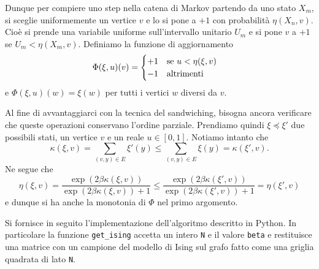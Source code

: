 \documentclass[]{marticle}
\begin{document}
Dunque per compiere uno step nella catena di Markov partendo da uno stato $X_m$,
si sceglie uniformemente un vertice $v$ e lo si pone a $+1$ con probabilit\`a
$\eta(X_n, v)$. Cio\`e si prende una variabile uniforme sull'intervallo unitario
$U_m$ e si pone $v$ a $+1$ se $U_m<\eta(X_m,v)$. Definiamo la funzione di
aggiornamento
\[
    \Phi(\xi, u)(v) = 
    \begin{cases}
        +1 \text{\quad se $u < \eta(\xi,v)$}\\
        -1 \text{\quad altrimenti}
    \end{cases}
\]
e $\Phi(\xi,u)(w) = \xi(w)$ per tutti i vertici $w$ diversi da $v$.

Al fine di avvantaggiarci con la tecnica del sandwiching, bisogna ancora
verificare che queste operazioni conservano l'ordine parziale. Prendiamo quindi
$\xi \preceq \xi'$ due possibili stati, un vertice $v$ e un reale $u\in[0,1]$.
Notiamo intanto che
\[
    \kappa(\xi,v) = \sum_{(v,y)\in E} \xi'(y) \leq
    \sum_{(v,y)\in E} \xi(y) = \kappa(\xi', v).
\]
Ne segue che 
\[
    \eta(\xi,v) = \frac{\exp(2\beta\kappa(\xi,v))}{\exp(2\beta\kappa(\xi,v))+1}
    \leq \frac{\exp(2\beta\kappa(\xi',v))}{\exp(2\beta\kappa(\xi',v))+1}
    = \eta(\xi',v)
\]
e dunque si ha anche la monotonia di $\Phi$ nel primo argomento.

Si fornisce in seguito l'implementazione dell'algoritmo descritto in Python. In
particolare la funzione \texttt{get\_ising} accetta un intero \texttt{N} e il
valore \texttt{beta} e restituisce una matrice con un campione del modello di
Ising sul grafo fatto come una griglia quadrata di lato \texttt{N}.
\end{document}
